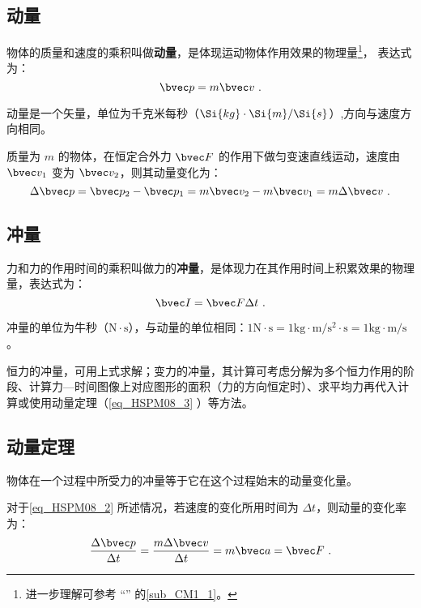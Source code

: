 

\subsection{动量}

物体的质量和速度的乘积叫做\textbf{动量}，是体现运动物体作用效果的物理量\footnote{进一步理解可参考 “” 的\autoref{sub_CM1_1}。}， 表达式为：
\begin{equation}
\bvec p = m\bvec v~.
\end{equation}

动量是一个矢量，单位为千克米每秒（$\Si{kg} \cdot \Si{m}/\Si{s}$）,方向与速度方向相同。

质量为 $m$ 的物体，在恒定合外力 $\bvec F $ 的作用下做匀变速直线运动，速度由 $\bvec v_1$ 变为 $\bvec v_2$，则其动量变化为：
\begin{equation}\label{eq_HSPM08_2}
\Delta \bvec p =\bvec p_2 - \bvec p_1 = m\bvec v_2 - m\bvec v_1 = m\Delta \bvec v~.
\end{equation}

\subsection{冲量}

力和力的作用时间的乘积叫做力的\textbf{冲量}，是体现力在其作用时间上积累效果的物理量，表达式为：
\begin{equation}
\bvec I=\bvec F \Delta t~.
\end{equation}

冲量的单位为牛秒（$\mathrm{N\cdot s}$），与动量的单位相同：$1\mathrm{N\cdot s}=1\mathrm{kg\cdot m/s^2 \cdot s}=1\mathrm{kg\cdot m/s}$。

恒力的冲量，可用上式求解；变力的冲量，其计算可考虑分解为多个恒力作用的阶段、计算力—时间图像上对应图形的面积（力的方向恒定时）、求平均力再代入计算或使用动量定理（\autoref{eq_HSPM08_3}  ）等方法。

\subsection{动量定理}

物体在一个过程中所受力的冲量等于它在这个过程始末的动量变化量。

对于\autoref{eq_HSPM08_2} 所述情况，若速度的变化所用时间为 $\Delta t$，则动量的变化率为：
\begin{equation}\label{eq_HSPM08_1}
\frac{\Delta \bvec p}{\Delta t}=\frac{m\Delta \bvec v}{\Delta t}=m\bvec a=\bvec F~.
\end{equation}

